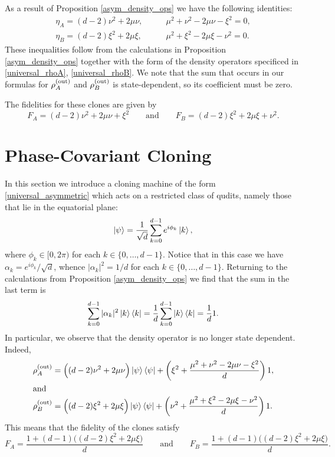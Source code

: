 \documentclass[reqno]{amsart}
\numberwithin{lemma}{section}
\numberwithin{proposition}{section}
\newcommand{\out}{\textnormal{out}}
\begin{document}
{As a result of Proposition \ref{asym_density_ops} we have the following identities:
\begin{align*}
\eta_{A} = (d-2) \nu^{2} + 2 \mu \nu, &\qquad \mu^{2} + \nu^{2} - 2\mu \nu - \xi^{2} = 0,\\
\eta_{B} = (d-2) \xi^{2} + 2 \mu \xi, &\qquad \mu^{2} + \xi^{2} - 2\mu \xi - \nu^{2} = 0.
\end{align*}
These inequalities follow from the calculations in Proposition \ref{asym_density_ops} together with the form of the density operators specificed in \eqref{universal_rhoA}, \eqref{universal_rhoB}. We note that the sum that occurs in our formulas for $\rho_{A}^{(\out)}$ and $\rho_{B}^{(\out)}$ is state-dependent, so its coefficient must be zero. 

The fidelities for these clones are given by
\begin{equation*}
F_{A} = (d-2) \nu^{2} + 2 \mu \nu + \xi^{2} \qquad \text{and} \qquad
F_{B} = (d-2) \xi^{2} + 2 \mu \xi + \nu^{2}.
\end{equation*}

\section{Phase-Covariant Cloning}


In this section we introduce a cloning machine of the form \eqref{universal_asymmetric} which acts on a restricted class of qudits, namely those that lie in the equatorial plane:
\begin{equation}
\ket{\psi} = \frac{1}{\sqrt{d}} \sum_{k=0}^{d-1} e^{i\phi_{k}} \ket{k},
\end{equation}
where $\phi_{k} \in [0, 2\pi)$ for each $k \in \{0,\ldots, d-1\}$.
Notice that in this case we have $ \alpha_{k} = e^{i\phi_{k}}/\sqrt{d}$, whence $\vert \alpha_{k} \vert^{2} = 1/d$ for each $k \in \{ 0,\ldots,d-1 \}$. Returning to the calculations from Proposition \ref{asym_density_ops} we find that the sum in the last term is
\begin{equation*}
\sum_{k=0}^{d-1} \vert \alpha_{k} \vert^{2} \ket{k} \bra{k} = \frac{1}{d} \sum_{k=0}^{d-1} \ket{k}\bra{k} = \frac{1}{d} 1.
\end{equation*}
In particular, we observe that the density operator is no longer state dependent. Indeed,
\begin{align*}
\rho_{A}^{(\out)} &= \Big ( (d-2) \nu^{2} + 2 \mu \nu \Big ) \ket{\psi}\bra{\psi} + \left ( \xi^{2} + \frac{\mu^{2} + \nu^{2} - 2\mu \nu - \xi^{2}}{d} \right )1,  \\
\intertext{and}
\rho_{B}^{(\out)} &= \Big ( (d-2) \xi^{2} + 2 \mu \xi \Big ) \ket{\psi}\bra{\psi} + \left ( \nu^{2} + \frac{\mu^{2} + \xi^{2} - 2\mu \xi - \nu^{2}}{d} \right )1.
\end{align*}
This means that the fidelity of the clones satisfy
\begin{equation*}
F_{A} = \frac{1 + (d-1)\Big ( (d-2) \xi^{2} + 2 \mu \xi \Big )}{d} \qquad \text{and} \qquad F_{B} = \frac{ 1 + (d-1)\Big ( (d-2) \xi^{2} + 2 \mu \xi \Big )}{d}.
\end{equation*}

}
\end{document}
